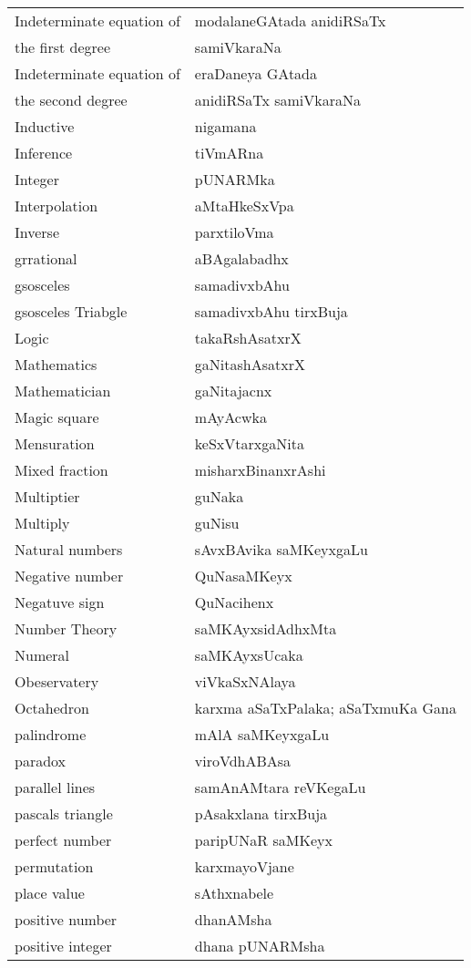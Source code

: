 \begin{longtable}{>{\rm}l@{\hspace{1cm}}l}
Indeterminate equation of & modalaneGAtada anidiRSaTx\\[-0.1cm]
the first degree & samiVkaraNa\\
Indeterminate equation of & eraDaneya GAtada\\[-0.1cm] 
the second degree &  anidiRSaTx samiVkaraNa\\
Inductive & nigamana\\
Inference & tiVmARna\\
Integer & pUNARMka\\
Interpolation & aMtaHkeSxVpa\\
Inverse & parxtiloVma\\
grrational & aBAgalabadhx\\
gsosceles & samadivxbAhu\\
gsosceles Triabgle & samadivxbAhu tirxBuja\\
Logic & takaRshAsatxrX\\
Mathematics & gaNitashAsatxrX\\
Mathematician & gaNitajacnx\\
Magic square & mAyAcwka\\
Mensuration & keSxVtarxgaNita\\
Mixed fraction & misharxBinanxrAshi\\
Multiptier & guNaka\\
Multiply & guNisu\\
Natural numbers & sAvxBAvika saMKeyxgaLu\\
Negative number & QuNasaMKeyx\\
Negatuve sign & QuNacihenx\\
Number Theory & saMKAyxsidAdhxMta\\
Numeral & saMKAyxsUcaka\\
Obeservatery & viVkaSxNAlaya\\
Octahedron & karxma aSaTxPalaka; aSaTxmuKa Gana\\
palindrome & mAlA saMKeyxgaLu\\
paradox & viroVdhABAsa\\
parallel lines & samAnAMtara reVKegaLu\\
pascals triangle & pAsakxlana tirxBuja\\
perfect number & paripUNaR saMKeyx\\
permutation & karxmayoVjane\\
place value & sAthxnabele\\
positive number & dhanAMsha\\
positive integer & dhana pUNARMsha\\

\end{longtable}
